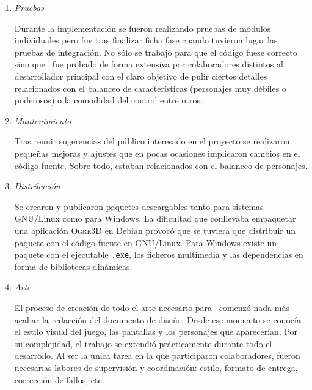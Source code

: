 \begin{enumerate}
\begin{enumerate}
        \item \textit{Pruebas}
        
        Durante la implementación se fueron realizando pruebas de módulos
        individuales pero fue tras finalizar ficha fase cuando tuvieron
        lugar las pruebas de integración. No sólo se trabajó para que
        el código fuese correcto sino que \juego\ fue probado de forma
        extensiva por colaboradores distintos al desarrollador principal con
        el claro objetivo de pulir ciertos detalles relacionados con el balanceo
        de características (personajes muy débiles o poderosos) o la comodidad
        del control entre otros.\\
        
        \item \textit{Mantenimiento}
        
        Tras reunir sugerencias del público interesado en el proyecto se
        realizaron pequeñas mejoras y ajustes que en pocas ocasiones implicaron
        cambios en el código fuente. Sobre todo, estaban relacionados
        con el balanceo de personajes.\\
        
        \item \textit{Distribución}
        
        Se crearon y publicaron paquetes descargables tanto para sistemas GNU/Linux
        como para Windows. La dificultad que conllevaba empaquetar una
        aplicación \textsc{Ogre3D} en Debian provocó que se tuviera
        que distribuir un paquete con el código fuente en GNU/Linux. Para
        Windows existe un paquete con el ejecutable \texttt{.exe}, los ficheros
        multimedia y las dependencias en forma de bibliotecas dinámicas.\\
        
        \item \textit{Arte}
        
        El proceso de creación de todo el arte necesario para \juego\ comenzó
        nada más acabar la redacción del documento de diseño. Desde ese momento
        se conocía el estilo visual del juego, las pantallas y los personajes
        que aparecerían. Por su complejidad, el trabajo se extendió prácticamente
        durante todo el desarrollo. Al ser la única tarea en la que 
        participaron colaboradores, fueron necesarias labores de supervisión
        y coordinación: estilo, formato de entrega, corrección de fallos, etc.\\
        

\end{enumerate}
\end{enumerate}
